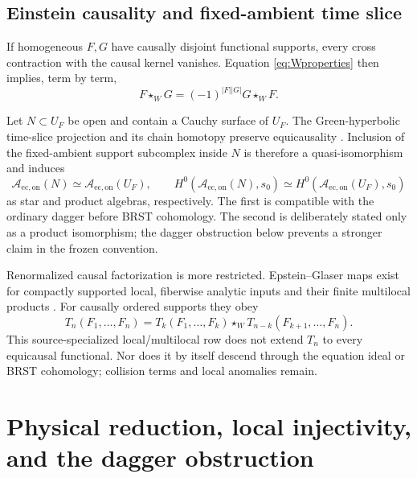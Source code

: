 \documentclass[11pt]{article}
\theoremstyle{definition}
\theoremstyle{remark}
\newcommand{\U}{U_{F}}
\newcommand{\cA}{\mathcal A}
\begin{document}
\subsection{Einstein causality and fixed-ambient time slice}

If homogeneous $F,G$ have causally disjoint functional supports, every cross
contraction with the causal kernel vanishes.  Equation \cref{eq:Wproperties} then
implies, term by term,
\begin{equation}
 F\star_WG=(-1)^{|F||G|}G\star_WF.
 \label{eq:einsteincausality}
\end{equation}

Let $N\subset\U$ be open and contain a Cauchy surface of $\U$.  The Green-hyperbolic time-slice
projection and its chain homotopy preserve equicausality
\cite{HawkinsRejznerVisser2023}.  Inclusion of the fixed-ambient support subcomplex
inside $N$ is therefore a quasi-isomorphism and induces
\begin{equation}
 \cA_{\mathrm{ec,on}}(N)\simeq\cA_{\mathrm{ec,on}}(\U),
 \qquad
 H^0(\cA_{\mathrm{ec,on}}(N),s_0)
 \simeq H^0(\cA_{\mathrm{ec,on}}(\U),s_0)
 \label{eq:timeslice}
\end{equation}
as star and product algebras, respectively.  The first is compatible with the ordinary
dagger before BRST cohomology.  The second is deliberately stated only as a product
isomorphism; the dagger obstruction below prevents a stronger claim in the frozen
convention.

Renormalized causal factorization is more restricted.  Epstein--Glaser maps exist for
compactly supported local, fiberwise analytic inputs and their finite multilocal
products \cite{BrunettiFredenhagen2000,BrunettiFredenhagenRejzner2016,
GwilliamRejzner2022}.  For causally ordered supports they obey
\begin{equation}
 T_n(F_1,\ldots,F_n)=T_k(F_1,\ldots,F_k)\star_W
 T_{n-k}(F_{k+1},\ldots,F_n).
 \label{eq:causalfactor}
\end{equation}
This source-specialized local/multilocal row does not extend $T_n$ to every equicausal
functional.  Nor does it by itself descend through the equation ideal or BRST
cohomology; collision terms and local anomalies remain.

\section{Physical reduction, local injectivity, and the dagger obstruction}
\label{sec:physicalreduction}
\end{document}
